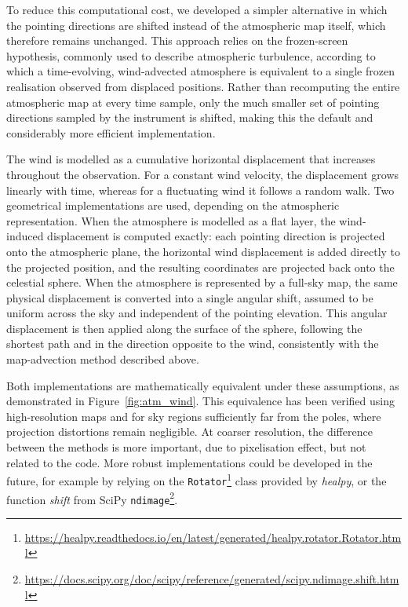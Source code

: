 \documentclass[../../thesis.tex]{subfiles}
\begin{document}
To reduce this computational cost, we developed a simpler alternative in which the pointing directions are shifted instead of the atmospheric map itself, which therefore remains unchanged. This approach relies on the frozen-screen hypothesis, commonly used to describe atmospheric turbulence, according to which a time-evolving, wind-advected atmosphere is equivalent to a single frozen realisation observed from displaced positions. Rather than recomputing the entire atmospheric map at every time sample, only the much smaller set of pointing directions sampled by the instrument is shifted, making this the default and considerably more efficient implementation.

The wind is modelled as a cumulative horizontal displacement that increases throughout the observation. For a constant wind velocity, the displacement grows linearly with time, whereas for a fluctuating wind it follows a random walk. Two geometrical implementations are used, depending on the atmospheric representation. When the atmosphere is modelled as a flat layer, the wind-induced displacement is computed exactly: each pointing direction is projected onto the atmospheric plane, the horizontal wind displacement is added directly to the projected position, and the resulting coordinates are projected back onto the celestial sphere. When the atmosphere is represented by a full-sky map, the same physical displacement is converted into a single angular shift, assumed to be uniform across the sky and independent of the pointing elevation. This angular displacement is then applied along the surface of the sphere, following the shortest path and in the direction opposite to the wind, consistently with the map-advection method described above.

Both implementations are mathematically equivalent under these assumptions, as demonstrated in Figure~\ref{fig:atm_wind}. This equivalence has been verified using high-resolution maps and for sky regions sufficiently far from the poles, where projection distortions remain negligible. At coarser resolution, the difference between the methods is more important, due to pixelisation effect, but not related to the code. More robust implementations could be developed in the future, for example by relying on the \texttt{Rotator}\footnote{\url{https://healpy.readthedocs.io/en/latest/generated/healpy.rotator.Rotator.html}} class provided by \emph{healpy}, or the function \emph{shift} from SciPy \texttt{ndimage}\footnote{\url{https://docs.scipy.org/doc/scipy/reference/generated/scipy.ndimage.shift.html}}.
\end{document}
